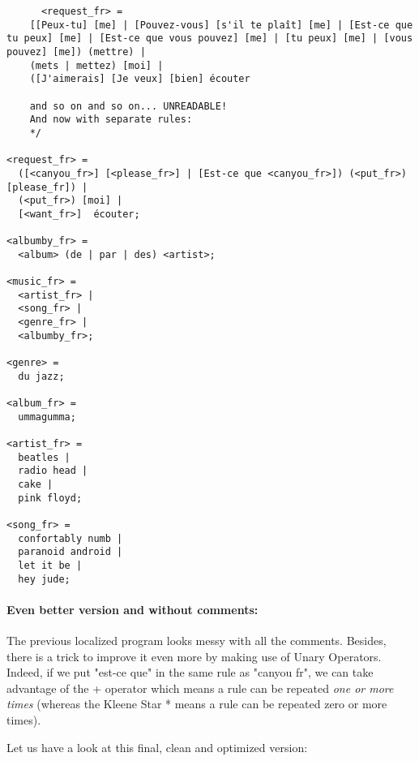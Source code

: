 \documentclass[12pt, a4paper]{article}
\begin{document}
\begin{lstlisting}
      <request_fr> = 
    [[Peux-tu] [me] | [Pouvez-vous] [s'il te plaît] [me] | [Est-ce que tu peux] [me] | [Est-ce que vous pouvez] [me] | [tu peux] [me] | [vous pouvez] [me]) (mettre) |
    (mets | mettez) [moi] |
    ([J'aimerais] [Je veux] [bien] écouter
    
    and so on and so on... UNREADABLE!
    And now with separate rules:
    */
  
<request_fr> = 
  ([<canyou_fr>] [<please_fr>] | [Est-ce que <canyou_fr>]) (<put_fr>) [please_fr]) |
  (<put_fr>) [moi] |
  [<want_fr>]  écouter;

<albumby_fr> = 
  <album> (de | par | des) <artist>;

<music_fr> = 
  <artist_fr> |
  <song_fr> | 
  <genre_fr> | 
  <albumby_fr>;

<genre> = 
  du jazz;

<album_fr> = 
  ummagumma;

<artist_fr> =
  beatles |
  radio head |
  cake |
  pink floyd;
  
<song_fr> =
  confortably numb |
  paranoid android |
  let it be |
  hey jude;
\end{lstlisting}

\paragraph{Even better version and without comments: }\mbox{}

The previous localized program looks messy with all the comments. Besides, there is a trick to improve it even more by making use of Unary Operators. Indeed, if we put "est-ce que" in the same rule as "canyou fr", we can take advantage of the + operator which means a rule can be repeated \emph{one or more times} (whereas the Kleene Star * means a rule can be repeated zero or more times).

Let us have a look at this final, clean and optimized version:
\end{document}
